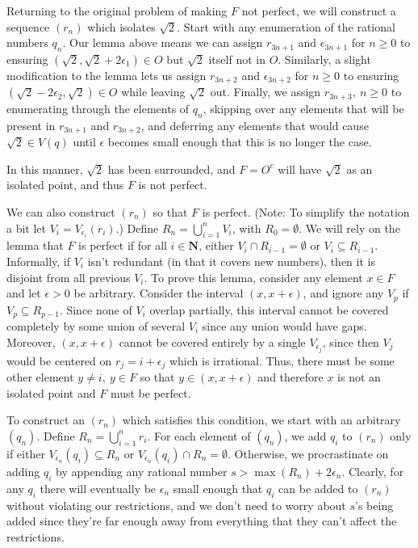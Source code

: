 \begin{solution}
{  Returning to the original problem of making \(F\) not perfect, we will construct a sequence \((r_n)\) which isolates \(\sqrt{2}\). Start with any enumeration of the rational numbers \(q_n\). Our lemma above means we can assign \(r_{3n + 1}\) and \(\epsilon_{3n + 1}\) for \(n \geq 0\) to ensuring \((\sqrt{2}, \sqrt{2} + 2\epsilon_1) \in O\) but \(\sqrt{2}\) itself not in \(O\). Similarly, a slight modification to the lemma lets us assign \(r_{3n + 2}\) and \(\epsilon_{3n + 2}\) for \(n \geq 0\) to ensuring \((\sqrt{2} - 2 \epsilon_2, \sqrt{2}) \in O\) while leaving \(\sqrt{2}\) out. Finally, we assign \(r_{3n+3},\ n \geq 0\) to enumerating through the elements of \(q_n\), skipping over any elements that will be present in \(r_{3n + 1}\) and \(r_{3n + 2}\), and deferring any elements that would cause \(\sqrt{2} \in V(q)\) until \(\epsilon\) becomes small enough that this is no longer the case.

  In this manner, \(\sqrt{2}\) has been surrounded, and \(F= O^c\) will have \(\sqrt{2}\) as an isolated point, and thus \(F\) is not perfect.

We can also construct \((r_n)\) so that \(F\) is perfect. (Note: To simplify the notation a bit let \(V_i = V_{\epsilon_i}(r_i)\).) Define \(R_n = \bigcup^n_{i=1} V_i\), with \(R_0 = \emptyset\). We will rely on the lemma that \(F\) is perfect if for all \(i \in \mathbf{N}\), either \(V_i \cap R_{i-1} = \emptyset\) or \(V_i \subseteq R_{i-1}\). Informally, if \(V_i\) isn't redundant (in that it covers new numbers), then it is disjoint from all previous \(V_i\). To prove this lemma, consider any element \(x \in F\) and let \(\epsilon >0\) be arbitrary. Consider the interval \((x, x + \epsilon)\), and ignore any \(V_p\) if \(V_p \subseteq R_{p-1}\). Since none of \(V_i\) overlap partially, this interval cannot be covered completely by some union of several \(V_i\) since any union would have gaps. Moreover, \((x, x + \epsilon)\) cannot be covered entirely by a single \(V_{\epsilon_j}\), since then \(V_j\) would be centered on \(r_j = i + \epsilon_j\) which is irrational. Thus, there must be some other element \(y \neq i,\ y\in F\) so that \(y \in (x, x + \epsilon)\) and therefore \(x\) is not an isolated point and \(F\) must be perfect.

To construct an \((r_n)\) which satisfies this condition, we start with an arbitrary \((q_n)\). Define \(R_n = \bigcup^n_{i=1} r_i\). For each element of \((q_n)\), we add \(q_i\) to \((r_n)\) only if either \(V_{\epsilon_n}(q_i) \subseteq R_n\) or \(V_{\epsilon_n}(q_i) \cap R_n = \emptyset\). Otherwise, we procrastinate on adding \(q_i\) by appending any rational number \(s > \max(R_n) + 2 \epsilon_n\). Clearly, for any \(q_i\) there will eventually be \(\epsilon_n\) small enough that \(q_i\) can be added to \((r_n)\) without violating our restrictions, and we don't need to worry about \(s\)'s being added since they're far enough away from everything that they can't affect the restrictions.

  }

\end{solution}

